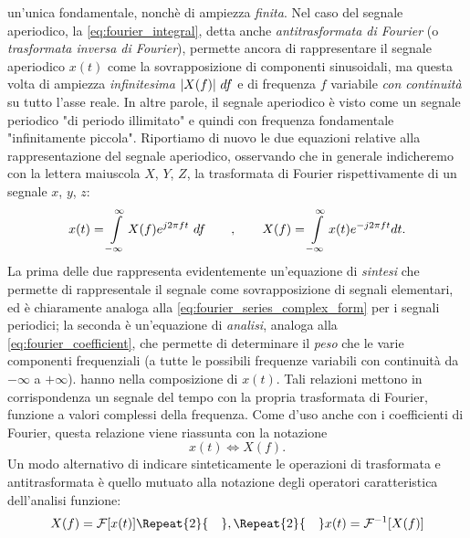 \documentclass[12pt,oneside,openany]{memoir}
\numberwithin{equation}{subsection}
\DeclarePairedDelimiter{\abs}{\lvert}{\rvert}
\newcommand{\quads}[1]{\Repeat{#1}{\quad}}
\newcommand{\df}{\ df}
\begin{document}
un'unica fondamentale, nonch\`e di ampiezza \textit{finita}. Nel caso del
segnale aperiodico, la \eqref{eq:fourier_integral}, detta anche
\textit{antitrasformata di Fourier} (o \textit{trasformata inversa di Fourier}),
permette ancora di rappresentare il segnale aperiodico $x(t)$ come la
sovrapposizione di componenti sinusoidali, ma questa volta di ampiezza
\textit{infinitesima} $\abs{X(f)} \df$ e di frequenza $f$ variabile \textit{con
continuit\`a} su tutto l'asse reale. In altre parole, il segnale aperiodico \`e
visto come un segnale periodico "di periodo illimitato" e quindi con frequenza
fondamentale "infinitamente piccola".
\bigbreak
Riportiamo di nuovo le due equazioni relative alla rappresentazione del segnale
aperiodico, osservando che in generale indicheremo con la lettera maiuscola $X$,
$Y$, $Z$, la trasformata di Fourier rispettivamente di un segnale $x$, $y$, $z$:
\begin{equation}
	x(t) = \int\displaylimits_{-\infty}^{\infty} X(f) e^{j 2 \pi f t} \df
	\quad\quad , \quad\quad X(f) =
	\int\displaylimits_{-\infty}^{\infty} x(t) e^{-j 2 \pi f t} dt.
\end{equation}
La prima delle due rappresenta evidentemente un'equazione di \textit{sintesi}
che permette di rappresentale il segnale come sovrapposizione di segnali
elementari, ed \`e chiaramente analoga alla
\eqref{eq:fourier_series_complex_form} per i segnali periodici; la seconda \`e
un'equazione di \textit{analisi}, analoga alla \eqref{eq:fourier_coefficient},
che permette di determinare il \textit{peso} che le varie componenti
frequenziali (a tutte le possibili frequenze variabili con continuit\`a da
$-\infty$ a $+\infty$). hanno nella composizione di $x(t)$. Tali relazioni
mettono in corrispondenza un segnale del tempo con la propria trasformata di
Fourier, funzione a valori complessi della frequenza. Come d'uso anche con i
coefficienti di Fourier, questa relazione viene riassunta con la notazione
\begin{equation}
	x(t) \iff X(f).
\end{equation}
Un modo alternativo di indicare sinteticamente le operazioni di trasformata e
antitrasformata \`e quello mutuato alla notazione degli operatori caratteristica
dell'analisi funzione:
\begin{equation}
	X(f) = \mathcal{F}[x(t)] \quads{2} , \quads{2} x(t) =
	\mathcal{F}^{-1}[X(f)]
\end{equation}

\end{document}
